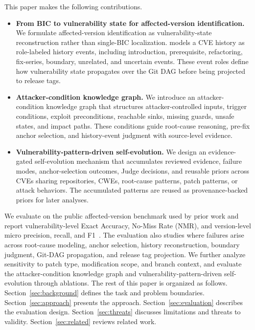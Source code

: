 This paper makes the following contributions.
\begin{itemize}
  \item \textbf{From BIC to vulnerability state for affected-version identification.}
  We formulate affected-version identification as vulnerability-state reconstruction rather than single-BIC localization. \toolname{} models a CVE history as role-labeled history events, including introduction, prerequisite, refactoring, fix-series, boundary, unrelated, and uncertain events. These event roles define how vulnerability state propagates over the Git DAG before being projected to release tags.

  \item \textbf{Attacker-condition knowledge graph.}
  We introduce an attacker-condition knowledge graph that structures attacker-controlled inputs, trigger conditions, exploit preconditions, reachable sinks, missing guards, unsafe states, and impact paths. These conditions guide root-cause reasoning, pre-fix anchor selection, and history-event judgment with source-level evidence.

  \item \textbf{Vulnerability-pattern-driven self-evolution.}
  We design an evidence-gated self-evolution mechanism that accumulates reviewed evidence, failure modes, anchor-selection outcomes, Judge decisions, and reusable priors across CVEs sharing repositories, CWEs, root-cause patterns, patch patterns, or attack behaviors. The accumulated patterns are reused as provenance-backed priors for later analyses.
\end{itemize}

We evaluate \toolname{} on the public affected-version benchmark used by prior work and report vulnerability-level Exact Accuracy, No-Miss Rate (NMR), and version-level micro precision, recall, and F1~\cite{howfar2025}.  The evaluation also studies where failures arise across root-cause modeling, anchor selection, history reconstruction, boundary judgment, Git-DAG propagation, and release tag projection. We further analyze sensitivity to patch type, modification scope, and branch context, and evaluate the attacker-condition knowledge graph and vulnerability-pattern-driven self-evolution through ablations.   The rest of this paper is organized as follows. Section~\ref{sec:background} defines the task and problem boundaries. Section~\ref{sec:approach} presents the \toolname{} approach. Section~\ref{sec:evaluation} describes the evaluation design. Section~\ref{sec:threats} discusses limitations and threats to validity. Section~\ref{sec:related} reviews related work.
